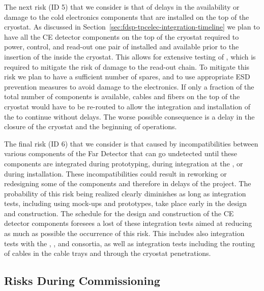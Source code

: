 The next risk (ID 5) that we consider is that of delays in the availability or
damage to the cold electronics components that are installed on the top of the
cryostat. As discussed in Section~\ref{sec:fdsp-tpcelec-integration-timeline}
we plan to have all the CE detector components on the top of the cryostat 
required to power, control, and read-out one pair of  installed
and available prior to the insertion of the  inside the cryostat.
This allows for extensive testing of , which is required to mitigate
the risk of damage to the read-out chain. To mitigate this risk we plan to have
a sufficient number of spares, and to use appropriate ESD prevention measures
to avoid damage to the electronics. If only a fraction of the total 
number of components is available, cables and fibers on the top of the cryostat
would have to be re-routed to allow the integration and installation of the
 to continue without delays. The worse possible consequence is a 
delay in the closure of the cryostat and the beginning of operations. 

The final risk (ID 6) that we consider is that caused by incompatibilities 
between various components of the Far Detector that can go undetected until
these components are integrated during prototyping, during integration at 
the , or during installation. These incompatibilities could 
result in reworking or redesigning some of the components and therefore in
delays of the project. The probability of this risk being realized clearly
diminishes as long as integration tests, including using mock-ups and prototypes,
take place early in the design and construction. The schedule for the 
design and construction of the CE detector components foresees a lost of
these integration tests aimed at reducing as much as possible the occurrence
of this risk. This includes also integration tests with the ,
, and  consortia, as well as integration tests
including the routing of cables in the cable trays and through the cryostat
penetrations. 

\subsection{Risks During Commissioning}
\label{sec:fdsp-tpcelec-risks-commissioning}

